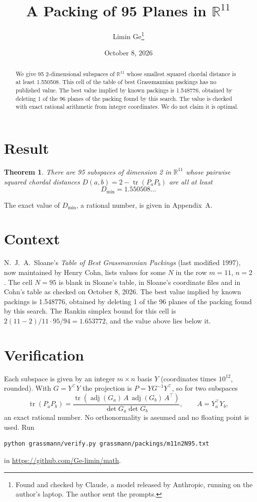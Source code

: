 \documentclass[11pt,a4paper]{article}
\title{A Packing of 95 Planes in $\mathbb{R}^{11}$}
\author{Limin Ge\thanks{Found and checked by Claude, a model released by Anthropic, running on the author's laptop. The author sent the prompts.}}
\date{October 8, 2026}
\newtheorem*{theorem}{Theorem}
\begin{document}
\maketitle
\begin{abstract}
We give 95 2-dimensional subspaces of $\mathbb{R}^{11}$ whose smallest squared chordal distance is at least 1.550508. This cell of the table of best Grassmannian packings has no published value. The best value implied by known packings is 1.548776, obtained by deleting 1 of the 96 planes of the packing found by this search. The value is checked with exact rational arithmetic from integer coordinates. We do not claim it is optimal.
\end{abstract}

\section{Result}
\begin{theorem}
There are 95 subspaces of dimension 2 in $\mathbb{R}^{11}$ whose pairwise squared chordal distances $D(a,b) = 2 - \operatorname{tr}(P_aP_b)$ are all at least
\[ D_{\min} = 1.550508\ldots \]
\end{theorem}
The exact value of $D_{\min}$, a rational number, is given in Appendix~A.


\section{Context}
N.~J.~A.~Sloane's \emph{Table of Best Grassmannian Packings} (last modified 1997), now maintained by Henry Cohn, lists values for some $N$ in the row $m=11$, $n=2$. The cell $N=95$ is blank in Sloane's table, in Sloane's coordinate files and in Cohn's table as checked on October 8, 2026. The best value implied by known packings is 1.548776, obtained by deleting 1 of the 96 planes of the packing found by this search. The Rankin simplex bound for this cell is $2(11-2)/11\cdot 95/94 = 1.653772$, and the value above lies below it.


\section{Verification}
Each subspace is given by an integer $m\times n$ basis $Y$ (coordinates times $10^{12}$, rounded). With $G=Y^\top Y$ the projection is $P=YG^{-1}Y^\top$, so for two subspaces
\[ \operatorname{tr}(P_aP_b)=\frac{\operatorname{tr}(\operatorname{adj}(G_a)\,A\,\operatorname{adj}(G_b)\,A^\top)}{\det G_a\det G_b},\qquad A=Y_a^\top Y_b, \]
an exact rational number. No orthonormality is assumed and no floating point is used. Run
\begin{verbatim}
python grassmann/verify.py grassmann/packings/m11n2N95.txt
\end{verbatim}
in \url{https://github.com/Ge-limin/math}.
\end{document}

